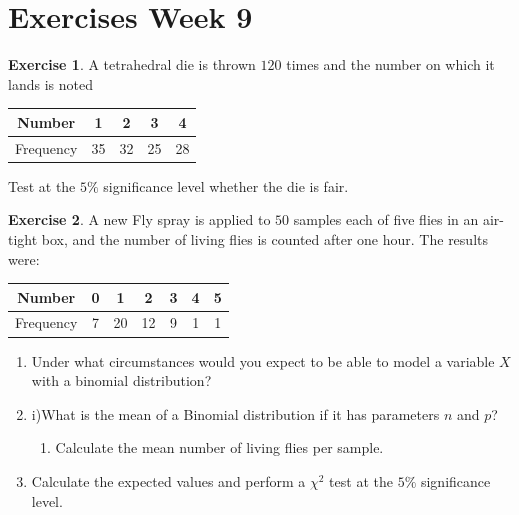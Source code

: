 \documentclass[
]{book}
\providecommand{\tightlist}{%
  \setlength{\itemsep}{0pt}\setlength{\parskip}{0pt}}
\theoremstyle{definition}
\theoremstyle{definition}
\theoremstyle{definition}
\newtheorem{exercise}{Exercise}[chapter]
\theoremstyle{definition}
\theoremstyle{remark}
\begin{document}
\hypertarget{exercises-week-9}{%
\section{Exercises Week 9}\label{exercises-week-9}}

\begin{exercise}
A tetrahedral die is thrown \(120\) times and the number on which it lands is noted

\begin{longtable}[]{@{}ccccc@{}}
\toprule
Number & 1 & 2 & 3 & 4\tabularnewline
\midrule
\endhead
Frequency & 35 & 32 & 25 & 28\tabularnewline
\bottomrule
\end{longtable}

Test at the \(5\%\) significance level whether the die is fair.
\end{exercise}

\begin{exercise}

A new Fly spray is applied to \(50\) samples each of five flies in an air-tight box, and the number of living flies is counted after one hour. The results were:

\begin{longtable}[]{@{}ccccccc@{}}
\toprule
Number & 0 & 1 & 2 & 3 & 4 & 5\tabularnewline
\midrule
\endhead
Frequency & 7 & 20 & 12 & 9 & 1 & 1\tabularnewline
\bottomrule
\end{longtable}

\begin{enumerate}
\def\labelenumi{\alph{enumi})}
\item
  Under what circumstances would you expect to be able to model a variable \(X\) with a binomial distribution?
\item
  i)What is the mean of a Binomial distribution if it has parameters \(n\) and \(p\)?

  \begin{enumerate}
  \def\labelenumii{\roman{enumii})}
  \setcounter{enumii}{1}
  \tightlist
  \item
    Calculate the mean number of living flies per sample.
  \end{enumerate}
\item
  Calculate the expected values and perform a \(\chi^2\) test at the \(5\%\) significance level.
\end{enumerate}

\end{exercise}
\end{document}

